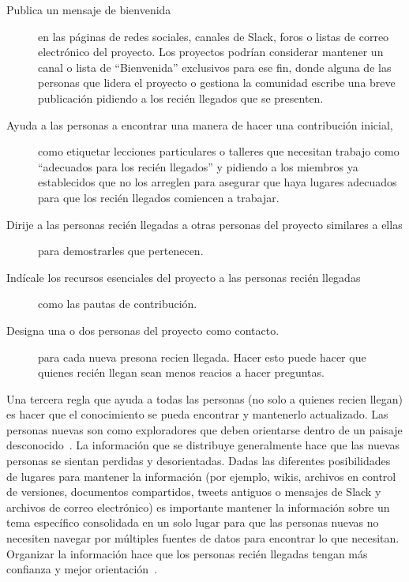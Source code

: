 \begin{description}

\item[Publica un mensaje de bienvenida]
  en las páginas de redes sociales, canales de Slack, foros o listas de correo electrónico del proyecto.
  Los proyectos podrían considerar mantener un canal o lista de ``Bienvenida'' exclusivos para ese fin,
  donde alguna de las personas que lidera el proyecto o gestiona la comunidad escribe una breve publicación pidiendo a los recién llegados que se presenten.

\item[Ayuda a las personas a encontrar una manera de hacer una contribución inicial,]
  como etiquetar lecciones particulares o talleres que necesitan trabajo como ``adecuados para los recién llegados''
  y pidiendo a los miembros ya establecidos que no los arreglen
  para asegurar que haya lugares adecuados para que los recién llegados comiencen a trabajar.

\item[Dirije a las personas recién llegadas a otras personas del proyecto similares a ellas]
  para demostrarles que pertenecen.

\item[Indícale los recursos esenciales del proyecto a las personas recién llegadas]
  como las pautas de contribución.

\item[Designa una o dos personas del proyecto como contacto.]
  para cada nueva presona recien llegada.
  Hacer esto puede hacer que quienes recién llegan sean menos reacios a hacer preguntas.

\end{description}

Una tercera regla que ayuda a todas las personas (no solo a quienes recien llegan)
es hacer que el conocimiento se pueda encontrar y mantenerlo actualizado.
Las personas nuevas son como exploradores que deben orientarse dentro de un paisaje desconocido~\cite{Dage2010}.
La información que se distribuye generalmente hace que las nuevas personas se sientan perdidas y desorientadas.
Dadas las diferentes posibilidades de lugares para mantener la información
(por ejemplo, wikis, archivos en control de versiones, documentos compartidos, tweets antiguos o mensajes de Slack y archivos de correo electrónico)
es importante mantener la información sobre un tema específico consolidada en un solo lugar
para que las personas nuevas no necesiten navegar por múltiples fuentes de datos para encontrar lo que necesitan.
Organizar la información hace que los personas recién llegadas tengan más confianza y mejor orientación~\cite{Stei2016}.

